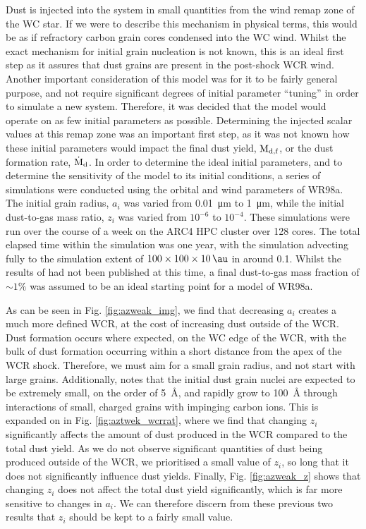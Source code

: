Dust is injected into the system in small quantities from the wind remap zone of the WC star.
If we were to describe this mechanism in physical terms, this would be as if refractory carbon grain cores condensed into the WC wind.
Whilst the exact mechanism for initial grain nucleation is not known, this is an ideal first step as it assures that dust grains are present in the post-shock WCR wind.
Another important consideration of this model was for it to be fairly general purpose, and not require significant degrees of initial parameter ``tuning'' in order to simulate a new system.
Therefore, it was decided that the model would operate on as few initial parameters as possible.
Determining the injected scalar values at this remap zone was an important first step, as it was not known how these initial parameters would impact the final dust yield, $\text{M}_\text{d,f}$, or the dust formation rate, $\dot{\text{M}}_\text{d}$. 
In order to determine the ideal initial parameters, and to determine the sensitivity of the model to its initial conditions, a series of simulations were conducted using the orbital and wind parameters of WR98a.
The initial grain radius, $a_i$ was varied from \SI{0.01}{\micro\metre} to \SI{1}{\micro\metre}, while the initial dust-to-gas mass ratio, $z_i$ was varied from $10^{-6}$ to $10^{-4}$.
These simulations were run over the course of a week on the ARC4 HPC cluster over 128 cores.
The total elapsed time within the simulation was one year, with the simulation advecting fully to the simulation extent of $100\times 100 \times 10 \, \si{\au}$ in around \SI{0.1}{\year}.
Whilst the results of \textcite{lauRevealingEfficientDust2021} had not been published at this time, a final dust-to-gas mass fraction of $\sim 1\%$ was assumed to be an ideal starting point for a model of WR98a.


As can be seen in Fig. \ref{fig:azweak_img}, we find that decreasing $a_i$ creates a much more defined WCR, at the cost of increasing dust outside of the WCR.
Dust formation occurs where expected, on the WC edge of the WCR, with the bulk of dust formation occurring within a short distance from the apex of the WCR shock.
Therefore, we must aim for a small grain radius, and not start with large grains.
Additionally, \textcite{zubkoPhysicalModelDust1998a} notes that the initial dust grain nuclei are expected to be extremely small, on the order of \SI{5}{\angstrom}, and rapidly grow to \SI{100}{\angstrom} through interactions of small, charged grains with impinging carbon ions.
This is expanded on in Fig. \ref{fig:aztwek_wcrrat}, where we find that changing $z_i$ significantly affects the amount of dust produced in the WCR compared to the total dust yield.
As we do not observe significant quantities of dust being produced outside of the WCR, we prioritised a small value of $z_i$, so long that it does not significantly influence dust yields.
Finally, Fig. \ref{fig:azweak_z} shows that changing $z_i$ does not affect the total dust yield significantly, which is far more sensitive to changes in $a_i$.
We can therefore discern from these previous two results that $z_i$ should be kept to a fairly small value.

